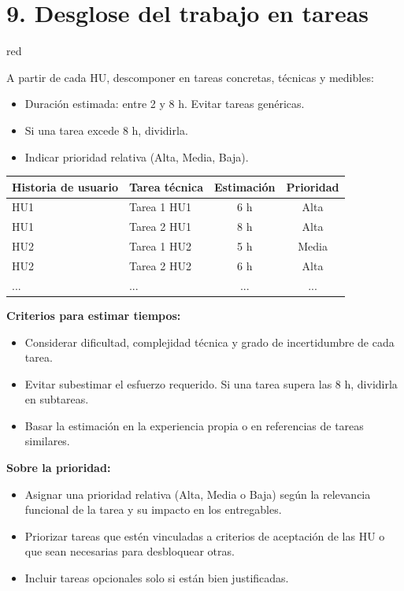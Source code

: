 \documentclass[
11pt, %
]{charter}
\begin{document}
\section{9. Desglose del trabajo en tareas}
\label{sec:wbs}

\begin{consigna}{red} %

A partir de cada HU, descomponer en tareas concretas, técnicas y medibles:

\begin{itemize}
  \item Duración estimada: entre 2 y 8 h. Evitar tareas genéricas.
  \item Si una tarea excede 8 h, dividirla.
  \item Indicar prioridad relativa (Alta, Media, Baja).
\end{itemize}

\begin{table}[htpb]
\centering
\begin{tabularx}{\linewidth}{@{}|X|X|c|c|@{}}
\hline
\rowcolor[HTML]{C0C0C0}
Historia de usuario & Tarea técnica & Estimación & Prioridad \\ \hline
HU1 & Tarea 1 HU1 & 6 h & Alta \\ \hline
HU1 & Tarea 2 HU1 & 8 h & Alta \\ \hline
HU2 & Tarea 1 HU2 & 5 h & Media \\ \hline
HU2 & Tarea 2 HU2 & 6 h & Alta \\ \hline
... & ... & ... & ... \\ \hline
\end{tabularx}
\end{table}

\textbf{Criterios para estimar tiempos:}
\begin{itemize}
  \item Considerar dificultad, complejidad técnica y grado de incertidumbre de cada tarea.
  \item Evitar subestimar el esfuerzo requerido. Si una tarea supera las 8 h, dividirla en subtareas.
  \item Basar la estimación en la experiencia propia o en referencias de tareas similares.
\end{itemize}

\textbf{Sobre la prioridad:}
\begin{itemize}
  \item Asignar una prioridad relativa (Alta, Media o Baja) según la relevancia funcional de la tarea y su impacto en los entregables.
  \item Priorizar tareas que estén vinculadas a criterios de aceptación de las HU o que sean necesarias para desbloquear otras.
  \item Incluir tareas opcionales solo si están bien justificadas.
\end{itemize}


\end{consigna}
\end{document}
